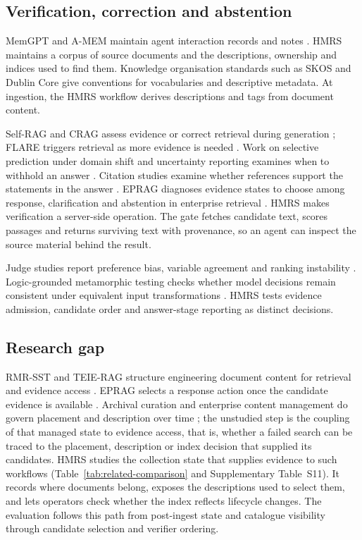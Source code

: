 \subsection{Verification, correction and abstention}

MemGPT and A-MEM maintain agent interaction records and notes
\citep{memgpt,amem}. HMRS maintains a corpus of source
documents and the descriptions, ownership and indices used to find them.
Knowledge organisation standards such as SKOS \citep{skos} and Dublin Core
\citep{dcmi-terms}
give conventions for vocabularies and descriptive metadata. At ingestion,
the HMRS workflow derives descriptions and tags from document content.

Self-RAG and CRAG assess evidence or correct retrieval during generation
\citep{selfrag,crag}; FLARE triggers retrieval as more evidence is needed
\citep{flare}. Work on selective prediction under domain shift and
uncertainty reporting examines when to withhold an answer
\citep{kamath,feng-abstain,yin-knowwhat}. Citation studies examine whether
references support the statements in the answer
\citep{liu-verifiability,gao-citations}.
EPRAG diagnoses evidence states to choose among response, clarification and
abstention in enterprise retrieval \citep{kinalioglu-kbs-eprag-2026}.
HMRS makes verification a server-side operation. The gate fetches
candidate text, scores passages and returns surviving text with provenance,
so an agent can inspect the source material behind the result.

Judge studies report preference bias, variable agreement and ranking
instability \citep{zheng-llmjudge,sun-urara,panickssery-selfpref}.
Logic-grounded metamorphic testing checks whether model decisions remain
consistent under equivalent input transformations \citep{zhou2026lgmt}.
HMRS tests evidence admission, candidate order and answer-stage reporting
as distinct decisions.

\subsection{Research gap}
\label{sec:gap}

RMR-SST and TEIE-RAG structure engineering document content for retrieval
and evidence access \citep{li-kbs-rmrsst-2026,shen-kbs-teierag-2026}. EPRAG
selects a response action once the candidate evidence is available
\citep{kinalioglu-kbs-eprag-2026}. Archival curation and enterprise
content management do govern placement and description over time
\citep{paivarinta-ecm-2005,park-metadata-quality-2009,missier-prov-2013};
the unstudied step is the coupling of that managed state to evidence
access, that is, whether a failed search can be traced to the placement,
description or index decision that supplied its candidates. HMRS studies the collection state that
supplies evidence to such workflows (Table~\ref{tab:related-comparison}
and Supplementary Table~S11). It records where documents belong, exposes
the descriptions used to select them, and lets operators check whether
the index reflects lifecycle changes. The evaluation follows this path from
post-ingest state and catalogue visibility through candidate selection and
verifier ordering.

